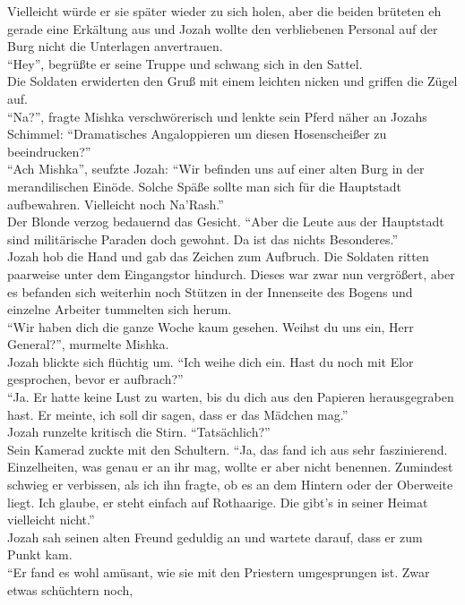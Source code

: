 Vielleicht würde er sie später wieder zu sich holen, aber die beiden brüteten eh gerade eine 
Erkältung aus und Jozah wollte den verbliebenen Personal auf der Burg nicht die Unterlagen 
anvertrauen.\\
``Hey'', begrüßte er seine Truppe und schwang sich in den Sattel.\\
Die Soldaten erwiderten den Gruß mit einem leichten nicken und griffen die Zügel auf.\\
``Na?'', fragte Mishka verschwörerisch und lenkte sein Pferd näher an Jozahs Schimmel: 
``Dramatisches Angaloppieren um diesen Hosenscheißer zu beeindrucken?''\\
``Ach Mishka'', seufzte Jozah: ``Wir befinden uns auf einer alten Burg in der merandilischen 
Einöde. Solche Späße sollte man sich für die Hauptstadt aufbewahren. Vielleicht noch Na'Rash.''\\
Der Blonde verzog bedauernd das Gesicht. ``Aber die Leute aus der Hauptstadt sind militärische 
Paraden doch gewohnt. Da ist das nichts Besonderes.''\\
Jozah hob die Hand und gab das Zeichen zum Aufbruch. Die Soldaten ritten paarweise unter dem 
Eingangstor hindurch. Dieses war zwar nun vergrößert, aber es befanden sich weiterhin noch Stützen 
in der Innenseite des Bogens und einzelne Arbeiter tummelten sich herum.\\
``Wir haben dich die ganze Woche kaum gesehen. Weihst du uns ein, Herr General?'', murmelte 
Mishka.\\
Jozah blickte sich flüchtig um. ``Ich weihe dich ein. Hast du noch mit Elor gesprochen, bevor er 
aufbrach?''\\
``Ja. Er hatte keine Lust zu warten, bis du dich aus den Papieren herausgegraben hast. Er meinte, 
ich soll dir sagen, dass er das Mädchen mag.''\\
Jozah runzelte kritisch die Stirn. ``Tatsächlich?''\\
Sein Kamerad zuckte mit den Schultern. ``Ja, das fand ich aus sehr faszinierend. Einzelheiten, was 
genau er an ihr mag, wollte er aber nicht benennen. Zumindest schwieg er verbissen, als ich ihn 
fragte, ob es an dem Hintern oder der Oberweite liegt. Ich glaube, er steht einfach auf Rothaarige. 
Die gibt's in seiner Heimat vielleicht nicht.''\\
Jozah sah seinen alten Freund geduldig an und wartete darauf, dass er zum Punkt kam.\\
``Er fand es wohl amüsant, wie sie mit den Priestern umgesprungen ist. Zwar etwas schüchtern noch, 
